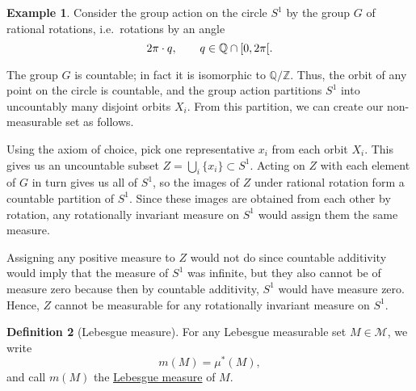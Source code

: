 \documentclass[a4paper,12pt]{scrreprt}
\newcommand{\Z}{\mathbb{Z}}
\newcommand{\Q}{\mathbb{Q}}
\newcommand{\defn}[1]{\ul{#1}}
\theoremstyle{definition}
\newtheorem{definition}{Definition}
\newtheorem{example}[definition]{Example}
\theoremstyle{plain}
\theoremstyle{remark}
\begin{document}
\begin{example}
  Consider the group action on the circle $S^{1}$ by the group $G$ of rational rotations, i.e.\ rotations by an angle
  \begin{equation*}
    2\pi \cdot q,\qquad q \in \Q \cap \interval[open right]{0}{2\pi}.
  \end{equation*}

  The group $G$ is countable; in fact it is isomorphic to $\Q/\Z$. Thus, the orbit of any point on the circle is countable, and the group action partitions $S^{1}$ into uncountably many disjoint orbits $X_{i}$. From this partition, we can create our non-measurable set as follows.

  Using the axiom of choice, pick one representative $x_{i}$ from each orbit $X_{i}$. This gives us an uncountable subset $Z = \bigcup_{i} \{ x_{i} \} \subset S^{1}$. Acting on $Z$ with each element of $G$ in turn gives us all of $S^{1}$, so the images of $Z$ under rational rotation form a countable partition of $S^{1}$. Since these images are obtained from each other by rotation, any rotationally invariant measure on $S^{1}$ would assign them the same measure.

  Assigning any positive measure to $Z$ would not do since countable additivity would imply that the measure of $S^{1}$ was infinite, but they also cannot be of measure zero because then by countable additivity, $S^{1}$ would have measure zero. Hence, $Z$ cannot be measurable for any rotationally invariant measure on $S^{1}$.
\end{example}

\begin{definition}[Lebesgue measure]
  \label{def:lebesguemeasure}
  For any Lebesgue measurable set $M \in \mathcal{M}$, we write
  \begin{equation*}
    m(M) = \mu^{*}(M),
  \end{equation*}
  and call $m(M)$ the \defn{Lebesgue measure} of $M$.
\end{definition}
\end{document}
